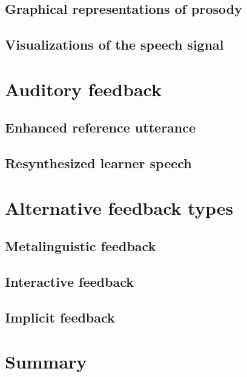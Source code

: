 	\subsection{Graphical representations of prosody}
	\label{sec:visual:graphics}
	
	\subsection{Visualizations of the speech signal}
	\label{sec:visual:visualizations}
	
	
	
\section{Auditory feedback}
\label{sec:fb:auditory}

	\subsection{Enhanced reference utterance}
	\label{sec:auditory:enhanced}
	
	\subsection{Resynthesized learner speech}
	\label{sec:auditory:resynth}
	
	
	
\section{Alternative feedback types}
\label{sec:fb:alternative}

	\subsection{Metalinguistic feedback}
	\label{sec:alternative:metaling}
	
	\subsection{Interactive feedback}
	\label{sec:alternative:interactive}
	
	\subsection{Implicit feedback}
	\label{sec:alternative:implicit}

\section{Summary}
\label{sec:fb:summary}